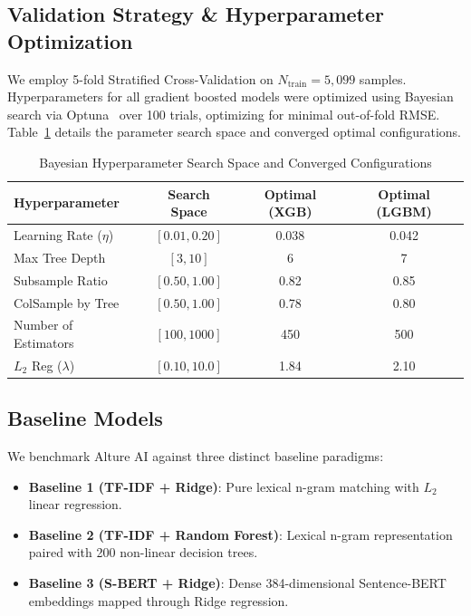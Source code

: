 \documentclass[conference]{IEEEtran}
\begin{document}
\subsection{Validation Strategy \& Hyperparameter Optimization}
We employ 5-fold Stratified Cross-Validation on $N_{\text{train}} = 5,099$ samples. Hyperparameters for all gradient boosted models were optimized using Bayesian search via Optuna~\cite{akiba2019optuna} over 100 trials, optimizing for minimal out-of-fold RMSE. Table~\ref{tab:hyperparams} details the parameter search space and converged optimal configurations.

\begin{table}[htbp]
\centering
\caption{Bayesian Hyperparameter Search Space and Converged Configurations}
\label{tab:hyperparams}
\begin{tabular}{lccc}
\toprule
\textbf{Hyperparameter} & \textbf{Search Space} & \textbf{Optimal (XGB)} & \textbf{Optimal (LGBM)} \\
\midrule
Learning Rate ($\eta$)  & $[0.01, 0.20]$       & 0.038                  & 0.042 \\
Max Tree Depth          & $[3, 10]$             & 6                      & 7 \\
Subsample Ratio         & $[0.50, 1.00]$        & 0.82                   & 0.85 \\
ColSample by Tree       & $[0.50, 1.00]$        & 0.78                   & 0.80 \\
Number of Estimators    & $[100, 1000]$         & 450                    & 500 \\
$L_2$ Reg ($\lambda$)   & $[0.10, 10.0]$        & 1.84                   & 2.10 \\
\bottomrule
\end{tabular}
\end{table}

\subsection{Baseline Models}
We benchmark Alture AI against three distinct baseline paradigms:
\begin{itemize}
    \item \textbf{Baseline 1 (TF-IDF + Ridge)}: Pure lexical n-gram matching with $L_2$ linear regression.
    \item \textbf{Baseline 2 (TF-IDF + Random Forest)}: Lexical n-gram representation paired with 200 non-linear decision trees.
    \item \textbf{Baseline 3 (S-BERT + Ridge)}: Dense 384-dimensional Sentence-BERT embeddings mapped through Ridge regression.
\end{itemize}
\end{document}
